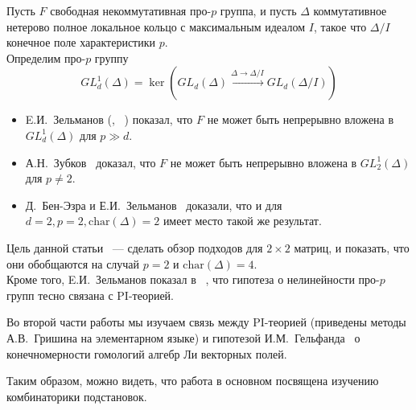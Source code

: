 \noindent
Пусть $F$ свободная некоммутативная про-$p$ группа, и пусть $\Delta$ коммутативное нетерово полное локальное кольцо с максимальным идеалом $I$, такое что
$\Delta/I$ конечное поле характеристики $p$.\\
Определим про-$p$ группу
\[GL_d^1(\Delta) = \ker\left( GL_d(\Delta) \xrightarrow{\Delta\to\Delta/I} GL_d(\Delta/I) \right)\]
\begin{itemize}
    \item E.И.\ Зельманов (\cite{Zelmanov1}, ~\cite{Zelmanov2}) показал, что $F$ не может быть непрерывно вложена в $GL_d^1(\Delta)$ для $p\gg d$.
    \item А.Н.\ Зубков~\cite{Zubkov} доказал, что $F$ не может быть непрерывно вложена в $GL_2^1(\Delta)$ для $p\neq2$.
    \item Д.\ Бен-Эзра и Е.И.\ Зельманов~\cite{Ben-Ezra-Zelmanov} доказали, что и для\\$d=2, p=2, \mathrm{char}(\Delta)=2$ имеет место такой же результат.
\end{itemize}

Цель данной статьи ~--- сделать обзор подходов для $2\times2$ матриц, и показать, что они обобщаются на случай $p=2$ и $\mathrm{char}(\Delta)=4$.\\
Кроме того, E.И.\ Зельманов показал в ~\cite{Zelmanov1}, что гипотеза о нелинейности про-$p$ групп тесно связана с PI-теорией.

Во второй части работы мы изучаем связь между PI-теорией (приведены методы А.В.\ Гришина на элементарном языке)
и гипотезой И.М.\ Гельфанда~\cite{Gelfand} о конечномерности гомологий алгебр Ли векторных полей.

Таким образом, можно видеть, что работа в основном посвящена изучению комбинаторики подстановок.